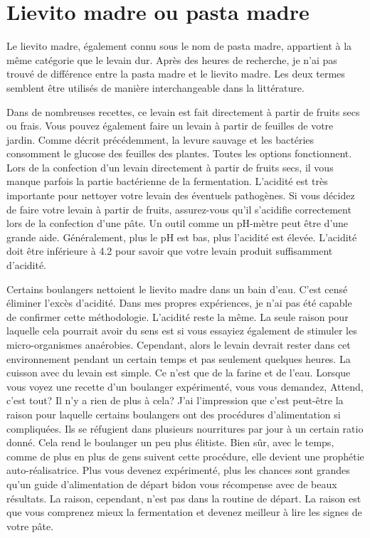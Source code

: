 \section{Lievito madre ou pasta madre}

Le lievito madre, également connu sous le nom de pasta madre, appartient à la même catégorie que
le levain dur. Après des heures de recherche, je n'ai pas
trouvé de différence entre la pasta madre et le lievito madre. Les deux termes semblent être
utilisés de manière interchangeable dans la littérature.

Dans de nombreuses recettes, ce levain est fait directement
à partir de fruits secs ou frais. Vous pouvez également faire un levain à partir de feuilles de votre
jardin. Comme décrit précédemment, la levure sauvage et les bactéries consomment le glucose
des feuilles des plantes. Toutes les options fonctionnent. Lors de la confection d'un levain directement
à partir de fruits secs, il vous manque parfois la partie bactérienne de la fermentation.
L'acidité est très importante pour nettoyer votre levain des éventuels
pathogènes. Si vous décidez de faire votre levain à partir de fruits, assurez-vous qu'il
s'acidifie correctement lors de la confection d'une pâte. Un outil comme un pH-mètre peut être d'une grande
aide. Généralement, plus le pH est bas, plus l'acidité est élevée. L'acidité
doit être inférieure à 4.2 pour savoir que votre levain produit suffisamment d'acidité.

Certains boulangers nettoient le lievito madre dans un bain d'eau. C'est censé
éliminer l'excès d'acidité. Dans mes propres expériences, je n'ai pas été capable de confirmer
cette méthodologie. L'acidité reste la même. La seule raison pour laquelle cela pourrait
avoir du sens est si vous essayiez également de stimuler les micro-organismes anaérobies. Cependant, alors le
levain devrait rester dans cet environnement pendant un certain temps et pas seulement
quelques heures.
La cuisson avec du levain est simple. Ce n'est que de la farine et de l'eau. Lorsque vous voyez une recette
d'un boulanger expérimenté, vous vous demandez, Attend, c'est tout? Il n'y a rien de plus
à cela? J'ai l'impression que c'est peut-être la raison pour laquelle certains boulangers ont des procédures d'alimentation si compliquées. Ils se réfugient dans plusieurs nourritures par jour à un certain ratio donné.
Cela rend le boulanger un peu plus élitiste. Bien sûr, avec le temps, comme
de plus en plus de gens suivent cette procédure, elle devient une prophétie auto-réalisatrice.
Plus vous devenez expérimenté, plus les chances sont grandes qu'un guide d'alimentation de départ bidon
vous récompense avec de beaux résultats. La raison, cependant, n'est
pas dans la routine de départ. La raison est que vous comprenez mieux la fermentation
et devenez meilleur à lire les signes de votre pâte.

